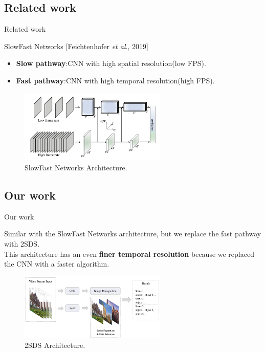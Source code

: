 \documentclass[aspectratio=43,display]{beamer}
\begin{document}
		\subsection{Related work}

			\begin{frame}{Related work}

				SlowFast Networks [Feichtenhofer \textit{et al}., 2019]

				\begin{itemize}
					\item \textbf{Slow pathway}:CNN with high spatial resolution(low FPS).
					\item \textbf{Fast pathway}:CNN with high temporal resolution(high FPS).
				\end{itemize}

				\begin{figure}
					\includegraphics[width=7cm]{images/slowfast-networks.png}
					\caption{\label{fig:SlowFast-Networks}SlowFast Networks Architecture.}
				\end{figure}

			\end{frame}

		\subsection{Our work}
		
			\begin{frame}{Our work}

				Similar with the SlowFast Networks architecture, but we replace the fast pathway with 2SDS. \\
				This architecture has an even \textbf{finer temporal resolution} because we replaced the CNN with a faster algorithm.

				\vskip 0.2cm

				\begin{figure}
					\includegraphics[width=7cm]{images/2SDS.png}
					\caption{\label{fig:2SDS}2SDS Architecture.}
				\end{figure}

			\end{frame}
\end{document}
